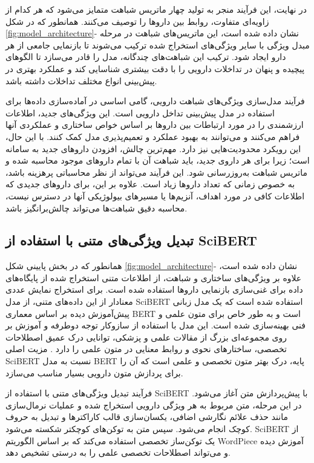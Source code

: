 در نهایت، این فرآیند منجر به تولید چهار ماتریس شباهت متمایز می‌شود که هر کدام از زاویه‌ای متفاوت، روابط بین داروها را توصیف می‌کنند. همانطور که در شکل \ref{fig:model_architecture}- نشان داده شده است، این ماتریس‌های شباهت در مرحله مبدل ویژگی با سایر ویژگی‌های استخراج شده ترکیب می‌شوند تا بازنمایی جامعی از هر دارو ایجاد شود. ترکیب این شباهت‌های چندگانه، مدل را قادر می‌سازد تا الگوهای پیچیده و پنهان در تداخلات دارویی را با دقت بیشتری شناسایی کند و عملکرد بهتری در پیش‌بینی انواع مختلف تداخلات داشته باشد.

فرآیند مدل‌سازی ویژگی‌های شباهت دارویی، گامی اساسی در آماده‌سازی داده‌ها برای استفاده در مدل پیش‌بینی تداخل دارویی است. این ویژگی‌های جدید، اطلاعات ارزشمندی را در مورد ارتباطات بین داروها بر اساس خواص ساختاری و عملکردی آنها فراهم می‌کنند و می‌توانند به بهبود عملکرد و تعمیم‌پذیری مدل کمک کنند. با این حال، این رویکرد محدودیت‌هایی نیز دارد. مهم‌ترین چالش، افزودن داروهای جدید به سامانه است؛ زیرا برای هر داروی جدید، باید شباهت آن با تمام داروهای موجود محاسبه شده و ماتریس شباهت به‌روزرسانی شود. این فرآیند می‌تواند از نظر محاسباتی پرهزینه باشد، به خصوص زمانی که تعداد داروها زیاد است. علاوه بر این، برای داروهای جدیدی که اطلاعات کافی در مورد اهداف، آنزیم‌ها یا مسیرهای بیولوژیکی آنها در دسترس نیست، محاسبه دقیق شباهت‌ها می‌تواند چالش‌برانگیز باشد.

\subsection{تبدیل ویژگی‌های متنی با استفاده از SciBERT}

همانطور که در بخش پایینی شکل \ref{fig:model_architecture}- نشان داده شده است، علاوه بر ویژگی‌های ساختاری و شباهت، از اطلاعات متنی استخراج شده از پایگاه‌های داده برای غنی‌سازی بازنمایی داروها استفاده شده است. برای استخراج نمایش عددی معنادار از این داده‌های متنی، از مدل SciBERT استفاده شده است که یک مدل زبانی پیش‌آموزش دیده بر اساس معماری BERT \cite{ref_devlin2018} است و به طور خاص برای متون علمی و فنی بهینه‌سازی شده است. این مدل با استفاده از سازوکار توجه دوطرفه و آموزش بر روی مجموعه‌ای بزرگ از مقالات علمی و پزشکی، توانایی درک عمیق اصطلاحات تخصصی، ساختارهای نحوی و روابط معنایی در متون علمی را دارد \cite{ref_beltagy2019}. مزیت اصلی SciBERT نسبت به مدل BERT پایه، درک بهتر متون تخصصی و علمی است که آن را برای پردازش متون دارویی بسیار مناسب می‌سازد.

فرآیند تبدیل ویژگی‌های متنی با استفاده از SciBERT با پیش‌پردازش متن آغاز می‌شود. در این مرحله، متن مربوط به هر ویژگی دارویی استخراج شده و عملیات نرمال‌سازی مانند حذف علائم نگارشی اضافی، یکسان‌سازی قالب کاراکترها و تبدیل به حروف کوچک انجام می‌شود. سپس متن به توکن‌های کوچکتر شکسته می‌شود. SciBERT از یک توکن‌ساز تخصصی استفاده می‌کند که بر اساس الگوریتم WordPiece آموزش دیده و می‌تواند اصطلاحات تخصصی علمی را به درستی تشخیص دهد.

